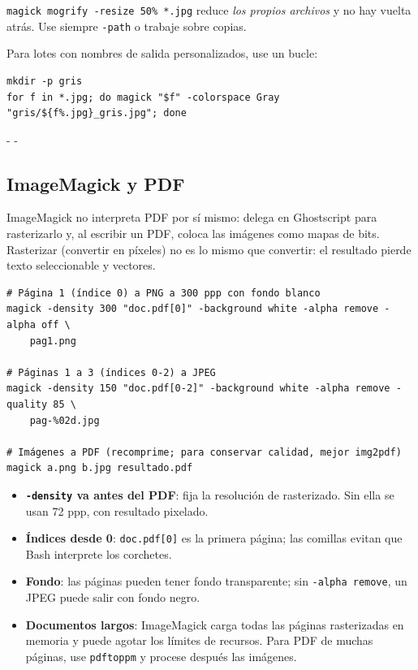 \documentclass[11pt,a4paper]{article}
\makeatletter
\newcommand{\necesitaespacio}[1]{\par\penalty-100\begingroup
	\setlength{\dimen@}{#1}\dimen@ii\pagegoal\advance\dimen@ii-\pagetotal
	\ifdim\dimen@>\dimen@ii\ifdim\dimen@ii>\z@\vfil\fi\penalty-\@M\fi\endgroup}
\newcommand{\cmd}[1]{\texttt{\textcolor{colcmd}{#1}}}      %
\newcommand{\opt}[1]{\texttt{\textcolor{colopt}{#1}}}      %
\newcommand{\arch}[1]{\texttt{\textcolor{colarch}{#1}}}    %
\makeatother
\begin{document}
	\begin{advertencia}
		\cmd{magick mogrify -resize 50\% *.jpg} reduce \emph{los propios archivos} y no hay vuelta atrás. Use siempre \opt{-path} o trabaje sobre copias.
	\end{advertencia}
	
	Para lotes con nombres de salida personalizados, use un bucle:
	
	\begin{lstlisting}
mkdir -p gris
for f in *.jpg; do magick "$f" -colorspace Gray "gris/${f%.jpg}_gris.jpg"; done
\end{lstlisting}
	
	\necesitaespacio{8\baselineskip}
	\subsection{ImageMagick y PDF}\label{sec:im-pdf}
	
	ImageMagick no interpreta PDF por sí mismo: delega en Ghostscript para rasterizarlo y, al escribir un PDF, coloca las imágenes como mapas de bits. Rasterizar (convertir en píxeles) no es lo mismo que convertir: el resultado pierde texto seleccionable y vectores.
	
	\begin{lstlisting}
# Página 1 (índice 0) a PNG a 300 ppp con fondo blanco
magick -density 300 "doc.pdf[0]" -background white -alpha remove -alpha off \
    pag1.png

# Páginas 1 a 3 (índices 0-2) a JPEG
magick -density 150 "doc.pdf[0-2]" -background white -alpha remove -quality 85 \
    pag-%02d.jpg

# Imágenes a PDF (recomprime; para conservar calidad, mejor img2pdf)
magick a.png b.jpg resultado.pdf
\end{lstlisting}
	
	\begin{itemize}
		\item \textbf{\opt{-density} va antes del PDF}: fija la resolución de rasterizado. Sin ella se usan 72 ppp, con resultado pixelado.
		\item \textbf{Índices desde 0}: \arch{doc.pdf[0]} es la primera página; las comillas evitan que Bash interprete los corchetes.
		\item \textbf{Fondo}: las páginas pueden tener fondo transparente; sin \opt{-alpha remove}, un JPEG puede salir con fondo negro.
		\item \textbf{Documentos largos}: ImageMagick carga todas las páginas rasterizadas en memoria y puede agotar los límites de recursos. Para PDF de muchas páginas, use \cmd{pdftoppm} y procese después las imágenes.
	\end{itemize}
	
\end{document}
